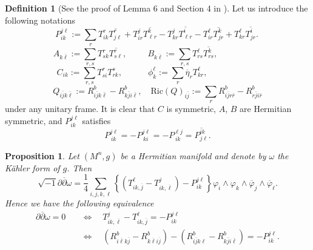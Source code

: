 \documentclass{amsart}
\numberwithin{equation}{section}
\newtheorem{proposition}[theorem]{Proposition}
\theoremstyle{definition}
\newtheorem{definition}  [theorem]     {Definition}
\renewcommand{\1}{\mathds{1}}
\renewcommand{\>}{\rightarrow}
\begin{document}
\begin{definition}[See the proof of Lemma 6 and Section 4 in \cite{ZhaoZ19Str}]\label{def3.3}
Let us introduce the following notations
\[P_{ik}^{j \ell}:=  \sum_r T^r_{ik}\overline{T^r_{j\ell}} + T^j_{ir} \overline{T^k_{\ell r}}
- T^j_{kr}\overline{T^i_{\ell r}} -T^\ell_{ir} \overline{T^k_{jr}} + T^\ell_{kr}\overline{T^i_{jr}}. \ \]
\[ A_{k\overline{\ell }} := \sum_{r,s} T^r_{sk} \overline{ T^r_{s\ell } } , \quad   \quad \ \  B_{k\overline{\ell }} := \sum_{r,s} T^{\ell }_{rs} \overline{ T^k_{rs } } ,  \quad  \quad  \quad  \quad \quad  \  \]
\[C_{ik} := \sum_{r,s} T^r_{si} T^s_{rk},  \quad  \quad  \quad  \phi^{\ell }_k := \sum_r \overline{\eta}_r T^{\ell }_{kr}, \quad  \quad  \quad  \quad  \quad  \quad    \]
\[Q_{i\bar{j}k\bar{\ell}} := R^b_{i\bar{j}k\bar{\ell}} - R^b_{k \bar{j} i \bar{\ell}},
\quad \mathrm{Ric}(Q)_{i\bar{j}} := \sum_r R^b_{i\bar{j}r\bar{r}} - R^b_{r \bar{j} i \bar{r}}\]
under any unitary frame. It is clear that $C$ is symmetric, $A$, $B$ are Hermitian symmetric, and $P_{ik}^{j \ell}$ satisfies
\[ P^{j\ell}_{\,ik} = - P^{j\ell }_{\,ki} = - P^{\ell j}_{\,ik} = \overline{ P^{ik}_{j\ell } }.\]
\end{definition}

\begin{proposition}\label{plcld}
Let $(M^n,g)$ be a Hermitian manifold and denote by $\omega$ the K\"ahler form of $g$. Then
\[\sqrt{-1}\partial \overline{\partial} \omega = \frac{1}{4} \sum_{i,j,k,\ell} \left\{ (T^{\ell}_{ik,\overline{j}} - T^j_{ik,\overline{\ell}})-P^{j\ell}_{ik} \right\} \varphi_i \wedge \varphi_k \wedge \overline{\varphi}_j \wedge \overline{\varphi}_{\ell}.\]
Hence we have the following equivalence
\[\begin{aligned}
\partial \overline{\partial} \omega=0 \quad & \Longleftrightarrow \quad T^{j}_{ik,\overline{\ell}} - T^{\ell}_{ik,\overline{j}}=-P^{j\ell}_{ik}\\
& \Longleftrightarrow \quad (R^b_{i \overline{\ell} k \overline{j}}-R^b_{k \overline{\ell} i \overline{j}})
- (R^b_{i \overline{j} k \ell} - R^b_{k \overline{j} i \overline{\ell}}) = - P^{j \ell}_{ik}.
\end{aligned}\]
\end{proposition}
\end{document}
